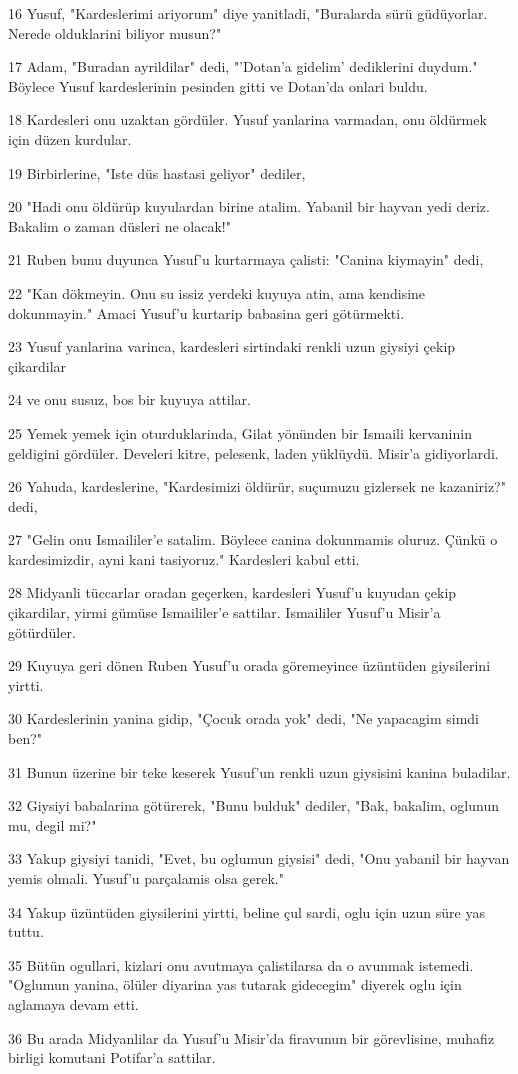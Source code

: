 \par 16 Yusuf, "Kardeslerimi ariyorum" diye yanitladi, "Buralarda sürü güdüyorlar. Nerede olduklarini biliyor musun?"
\par 17 Adam, "Buradan ayrildilar" dedi, "'Dotan'a gidelim' dediklerini duydum." Böylece Yusuf kardeslerinin pesinden gitti ve Dotan'da onlari buldu.
\par 18 Kardesleri onu uzaktan gördüler. Yusuf yanlarina varmadan, onu öldürmek için düzen kurdular.
\par 19 Birbirlerine, "Iste düs hastasi geliyor" dediler,
\par 20 "Hadi onu öldürüp kuyulardan birine atalim. Yabanil bir hayvan yedi deriz. Bakalim o zaman düsleri ne olacak!"
\par 21 Ruben bunu duyunca Yusuf'u kurtarmaya çalisti: "Canina kiymayin" dedi,
\par 22 "Kan dökmeyin. Onu su issiz yerdeki kuyuya atin, ama kendisine dokunmayin." Amaci Yusuf'u kurtarip babasina geri götürmekti.
\par 23 Yusuf yanlarina varinca, kardesleri sirtindaki renkli uzun giysiyi çekip çikardilar
\par 24 ve onu susuz, bos bir kuyuya attilar.
\par 25 Yemek yemek için oturduklarinda, Gilat yönünden bir Ismaili kervaninin geldigini gördüler. Develeri kitre, pelesenk, laden yüklüydü. Misir'a gidiyorlardi.
\par 26 Yahuda, kardeslerine, "Kardesimizi öldürür, suçumuzu gizlersek ne kazaniriz?" dedi,
\par 27 "Gelin onu Ismaililer'e satalim. Böylece canina dokunmamis oluruz. Çünkü o kardesimizdir, ayni kani tasiyoruz." Kardesleri kabul etti.
\par 28 Midyanli tüccarlar oradan geçerken, kardesleri Yusuf'u kuyudan çekip çikardilar, yirmi gümüse Ismaililer'e sattilar. Ismaililer Yusuf'u Misir'a götürdüler.
\par 29 Kuyuya geri dönen Ruben Yusuf'u orada göremeyince üzüntüden giysilerini yirtti.
\par 30 Kardeslerinin yanina gidip, "Çocuk orada yok" dedi, "Ne yapacagim simdi ben?"
\par 31 Bunun üzerine bir teke keserek Yusuf'un renkli uzun giysisini kanina buladilar.
\par 32 Giysiyi babalarina götürerek, "Bunu bulduk" dediler, "Bak, bakalim, oglunun mu, degil mi?"
\par 33 Yakup giysiyi tanidi, "Evet, bu oglumun giysisi" dedi, "Onu yabanil bir hayvan yemis olmali. Yusuf'u parçalamis olsa gerek."
\par 34 Yakup üzüntüden giysilerini yirtti, beline çul sardi, oglu için uzun süre yas tuttu.
\par 35 Bütün ogullari, kizlari onu avutmaya çalistilarsa da o avunmak istemedi. "Oglumun yanina, ölüler diyarina yas tutarak gidecegim" diyerek oglu için aglamaya devam etti.
\par 36 Bu arada Midyanlilar da Yusuf'u Misir'da firavunun bir görevlisine, muhafiz birligi komutani Potifar'a sattilar.

